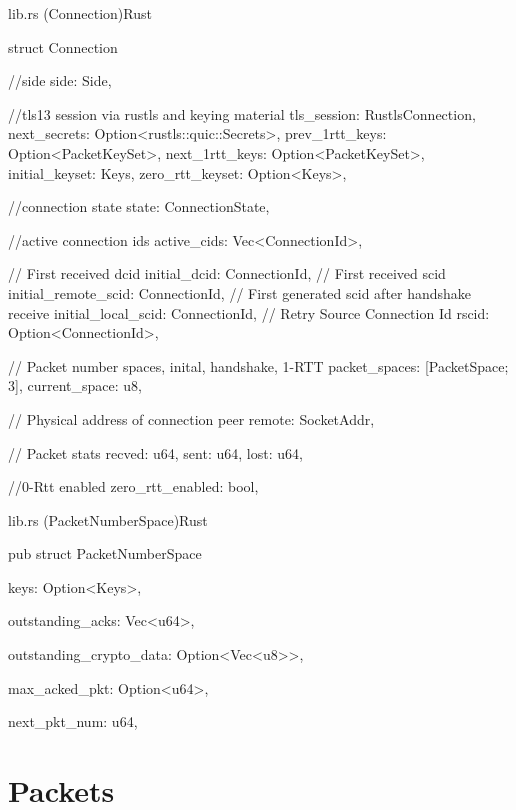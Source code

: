 \begin{codeblock}{lib.rs (Connection)}{Rust}
  \begin{rustcode}
    struct Connection {
        //side
        side: Side,
    
        //tls13 session via rustls and keying material
        tls_session: RustlsConnection,
        next_secrets: Option<rustls::quic::Secrets>,
        prev_1rtt_keys: Option<PacketKeySet>,
        next_1rtt_keys: Option<PacketKeySet>,
        initial_keyset: Keys,
        zero_rtt_keyset: Option<Keys>,
    
        //connection state
        state: ConnectionState,
    
        //active connection ids
        active_cids: Vec<ConnectionId>,
    
        // First received dcid
        initial_dcid: ConnectionId,
        // First received scid
        initial_remote_scid: ConnectionId,
        // First generated scid after handshake receive
        initial_local_scid: ConnectionId,
        // Retry Source Connection Id
        rscid: Option<ConnectionId>,
    
        // Packet number spaces, inital, handshake, 1-RTT
        packet_spaces: [PacketSpace; 3],
        current_space: u8,
    
        // Physical address of connection peer
        remote: SocketAddr,
    
        // Packet stats
        recved: u64,
        sent: u64,
        lost: u64,
    
        //0-Rtt enabled
        zero_rtt_enabled: bool,
    }
  \end{rustcode}
\end{codeblock}

\begin{codeblock}{lib.rs (PacketNumberSpace)}{Rust}
  \begin{rustcode}
    pub struct PacketNumberSpace {
        keys: Option<Keys>,
    
        outstanding_acks: Vec<u64>,
    
        outstanding_crypto_data: Option<Vec<u8>>,
    
        max_acked_pkt: Option<u64>,
    
        next_pkt_num: u64,
    }
  \end{rustcode}
\end{codeblock}

\section{Packets}

